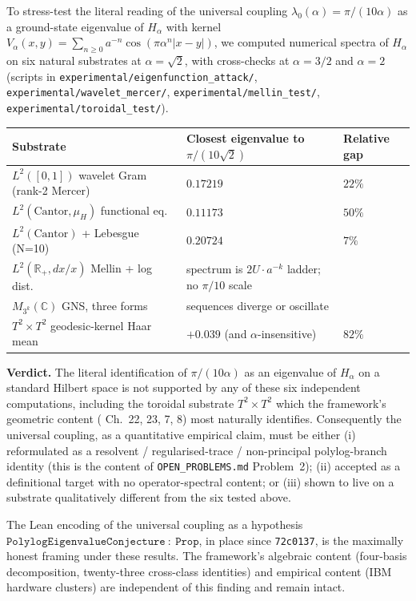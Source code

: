 \documentclass[11pt,a4paper]{article}
\theoremstyle{definition}
\theoremstyle{remark}
\begin{document}
To stress-test the literal reading of the universal coupling
$\lambda_0(\alpha) = \pi/(10\alpha)$ as a ground-state eigenvalue of
$H_\alpha$ with kernel $V_\alpha(x,y) = \sum_{n\ge 0} a^{-n}
\cos(\pi\alpha^n |x-y|)$, we computed numerical spectra of $H_\alpha$ on
six natural substrates at $\alpha=\sqrt{2}$, with cross-checks at
$\alpha=3/2$ and $\alpha=2$ (scripts in
\texttt{experimental/eigenfunction\_attack/},
\texttt{experimental/wavelet\_mercer/},
\texttt{experimental/mellin\_test/},
\texttt{experimental/toroidal\_test/}).

\begin{center}
\begin{tabular}{lll}
Substrate & Closest eigenvalue to $\pi/(10\sqrt{2})$ & Relative gap \\ \hline
$L^2([0,1])$ wavelet Gram (rank-2 Mercer)    & $0.17219$ & $22\%$ \\
$L^2(\text{Cantor}, \mu_H)$ functional eq.   & $0.11173$ & $50\%$ \\
$L^2(\text{Cantor})$ + Lebesgue (N=10)       & $0.20724$ & $7\%$ \\
$L^2(\mathbb{R}_+, dx/x)$ Mellin + log dist. & spectrum is $2U\cdot a^{-k}$ ladder; no $\pi/10$ scale \\
$M_{3^k}(\mathbb{C})$ GNS, three forms       & sequences diverge or oscillate \\
$T^2 \times T^2$ geodesic-kernel Haar mean   & $+0.039$ (and $\alpha$-insensitive) & $82\%$ \\
\end{tabular}
\end{center}

\textbf{Verdict.} The literal identification of $\pi/(10\alpha)$ as an
eigenvalue of $H_\alpha$ on a standard Hilbert space is not supported
by any of these six independent computations, including the toroidal
substrate $T^2\times T^2$ which the framework's geometric content
(\cite{cohen2025framework} Ch.~22, 23, 7, 8) most naturally identifies.
Consequently the universal coupling, as a quantitative empirical claim,
must be either
(i) reformulated as a resolvent / regularised-trace / non-principal
polylog-branch identity (this is the content of
\texttt{OPEN\_PROBLEMS.md} Problem~2);
(ii) accepted as a definitional target with no operator-spectral
content; or
(iii) shown to live on a substrate qualitatively different from the
six tested above.

The Lean encoding of the universal coupling as a hypothesis
$\mathtt{PolylogEigenvalueConjecture\ :\ Prop}$, in place since
\texttt{72c0137}, is the maximally honest framing under these results.
The framework's algebraic content (four-basis decomposition, twenty-three
cross-class identities) and empirical content (IBM hardware clusters)
are independent of this finding and remain intact.
\end{document}
